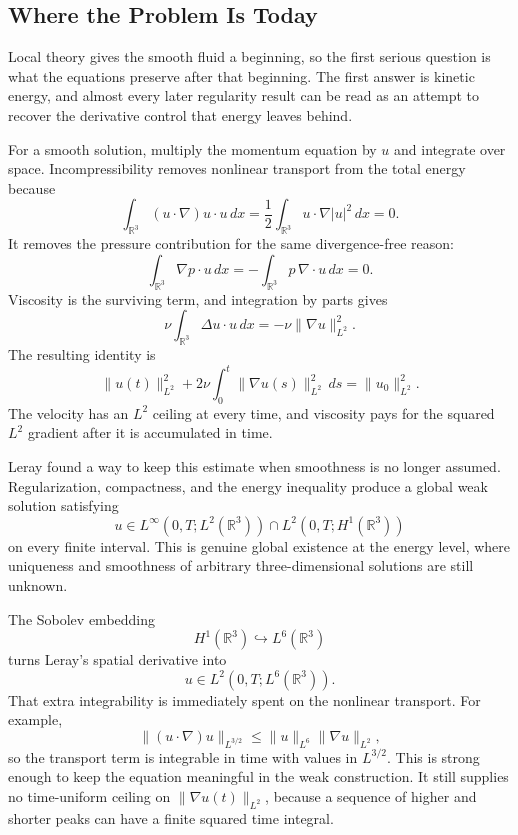 \subsection{Where the Problem Is Today}\label{sub:HistoricalEstimates}

Local theory gives the smooth fluid a beginning, so the first serious question is what the equations preserve after that beginning.
The first answer is kinetic energy, and almost every later regularity result can be read as an attempt to recover the derivative control that energy leaves behind.

\newpage
{}

For a smooth solution, multiply the momentum equation by \(u\) and integrate over space.
Incompressibility removes nonlinear transport from the total energy because
\[
  \int_{\mathbb R^3}(u\cdot\nabla)u\cdot u\,dx
  =
  \frac12\int_{\mathbb R^3}u\cdot\nabla|u|^2\,dx
  =0.
\]
It removes the pressure contribution for the same divergence-free reason:
\[
  \int_{\mathbb R^3}\nabla p\cdot u\,dx
  =
  -\int_{\mathbb R^3}p\,\nabla\cdot u\,dx
  =0.
\]
Viscosity is the surviving term, and integration by parts gives
\[
  \nu\int_{\mathbb R^3}\Delta u\cdot u\,dx
  =
  -\nu\lVert\nabla u\rVert_{L^2}^2.
\]
The resulting identity is
\[
  \lVert u(t)\rVert_{L^2}^2
  +
  2\nu\int_0^t\lVert\nabla u(s)\rVert_{L^2}^2\,ds
  =
  \lVert u_0\rVert_{L^2}^2.
\]
The velocity has an \(L^2\) ceiling at every time, and viscosity pays for the squared \(L^2\) gradient after it is accumulated in time.

Leray found a way to keep this estimate when smoothness is no longer assumed.
Regularization, compactness, and the energy inequality produce a global weak solution satisfying \parencite{Leray1934}
\[
  u\in
  L^\infty(0,T;L^2(\mathbb R^3))
  \cap
  L^2(0,T;H^1(\mathbb R^3))
\]
on every finite interval.
This is genuine global existence at the energy level, where uniqueness and smoothness of arbitrary three-dimensional solutions are still unknown.

The Sobolev embedding
\[
  H^1(\mathbb R^3)\hookrightarrow L^6(\mathbb R^3)
\]
turns Leray's spatial derivative into
\[
  u\in L^2(0,T;L^6(\mathbb R^3)).
\]
That extra integrability is immediately spent on the nonlinear transport.
For example,
\[
  \lVert(u\cdot\nabla)u\rVert_{L^{3/2}}
  \leq
  \lVert u\rVert_{L^6}
  \lVert\nabla u\rVert_{L^2},
\]
so the transport term is integrable in time with values in \(L^{3/2}\).
This is strong enough to keep the equation meaningful in the weak construction.
It still supplies no time-uniform ceiling on \(\lVert\nabla u(t)\rVert_{L^2}\), because a sequence of higher and shorter peaks can have a finite squared time integral.

